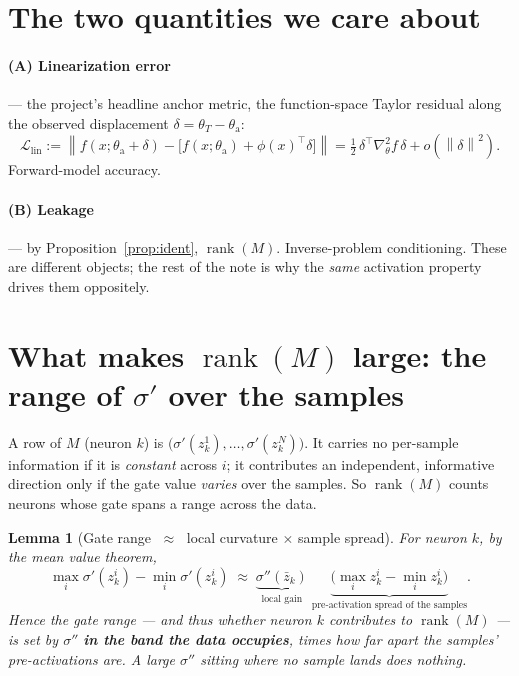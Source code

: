\documentclass[11pt]{article}
\newtheorem{lemma}{Lemma}
\newcommand{\norm}[1]{\left\lVert #1 \right\rVert}
\newcommand{\rank}{\operatorname{rank}}
\begin{document}
\section{The two quantities we care about}
\paragraph{(A) Linearization error} --- the project's headline anchor metric, the function-space Taylor
residual along the observed displacement $\delta=\theta_T-\theta_{\mathrm a}$:
\begin{equation}
  \mathcal L_{\mathrm{lin}}:=\norm{f(x;\theta_{\mathrm a}+\delta)-\big[f(x;\theta_{\mathrm a})+\phi(x)^\top\delta\big]}
  =\tfrac12\,\delta^\top\nabla^2_\theta f\,\delta+o(\norm{\delta}^2).
\end{equation}
Forward-model accuracy.

\paragraph{(B) Leakage} --- by Proposition~\ref{prop:ident}, $\rank(M)$. Inverse-problem conditioning.
These are different objects; the rest of the note is why the \emph{same} activation property drives
them oppositely.

\section{What makes $\rank(M)$ large: the range of $\sigma'$ over the samples}
A row of $M$ (neuron $k$) is $\big(\sigma'(z_k^1),\dots,\sigma'(z_k^N)\big)$. It carries no per-sample
information if it is \emph{constant} across $i$; it contributes an independent, informative direction
only if the gate value \emph{varies} over the samples. So $\rank(M)$ counts neurons whose gate spans a
range across the data.

\begin{lemma}[Gate range $\;\approx\;$ local curvature $\times$ sample spread]\label{lem:range}
For neuron $k$, by the mean value theorem,
\begin{equation}\label{eq:range}
  \max_i\sigma'(z_k^i)-\min_i\sigma'(z_k^i)\;\approx\;\underbrace{\sigma''(\bar z_k)}_{\text{local gain}}\;
  \underbrace{\big(\max_i z_k^i-\min_i z_k^i\big)}_{\text{pre-activation spread of the samples}} .
\end{equation}
Hence the gate range --- and thus whether neuron $k$ contributes to $\rank(M)$ --- is set by
$\sigma''$ \textbf{in the band the data occupies}, times how far apart the samples' pre-activations are.
A large $\sigma''$ sitting where no sample lands does nothing.
\end{lemma}
\end{document}
